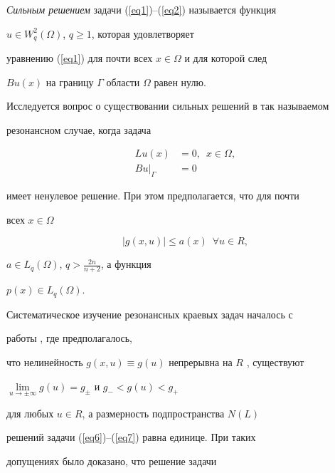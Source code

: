 {\it Сильным решением} задачи (\ref{eq1})--(\ref{eq2}) называется функция


$u\in W^2_q( \Omega)$, $q \ge 1$, которая удовлетворяет


уравнению (\ref{eq1}) для почти всех $x \in \Omega$ и для которой след


$B u(x)$ на границу $\Gamma$ области $\Omega$ равен нулю.





Исследуется вопрос о существовании сильных решений в так называемом


резонансном случае, когда задача


\begin{align}


\label{eq6}


Lu(x)&=0,\ \; x \in \Omega, \\


%


\label{eq7}


B u|_\Gamma&=0


\end{align}


имеет ненулевое решение. При этом предполагается, что для почти


всех $x \in \Omega$


\begin{equation}


|g(x,u)| \le a(x)\ \; \forall u \in R,


\label{eq8}


\end{equation}


$a \in L_q( \Omega)$, $q> \frac{2n}{n+2} $, а функция


$p(x) \in L_q( \Omega)$.





Систематическое изучение резонансных краевых задач началось с


работы \cite{n3}, где предполагалось,


что нелинейность $g(x,u) \equiv g(u)$ непрерывна на $R$ , существуют


$\lim\limits_{u \to \pm \infty} g(u)=g_{\pm}$ и $g_{-}<g(u)<g_{+}$


для любых $u \in R$, а размерность подпространства $N(L)$


решений задачи (\ref{eq6})--(\ref{eq7}) равна единице. При таких


допущениях было доказано, что решение задачи


